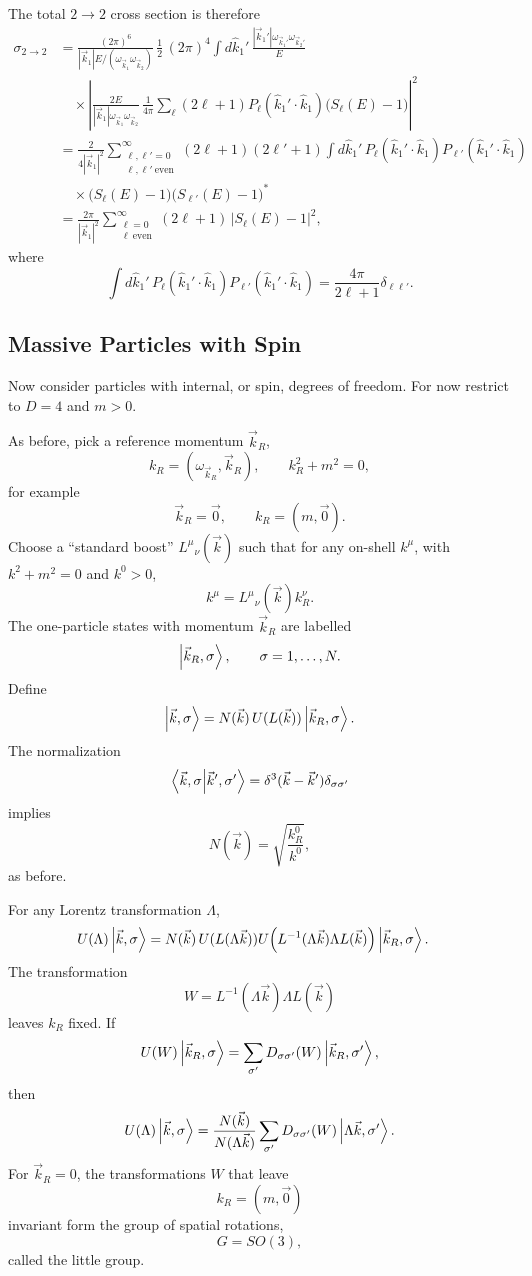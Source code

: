The total \(2\to2\) cross section is therefore
\[
\begin{aligned}
\sigma_{2\to2}
&=
\frac{(2\pi)^6}{|\vec k_1|E/(\omega_{\vec k_1}\omega_{\vec k_2})}\,
\frac12\,(2\pi)^4
\int d\hat k_1'\,
\frac{|\vec k_1'|\omega_{\vec k_1'}\omega_{\vec k_2'}}{E}
\\
&\quad \times
\left|
\frac{2E}{|\vec k_1|\omega_{\vec k_1}\omega_{\vec k_2}}\,
\frac{1}{4\pi}
\sum_\ell (2\ell+1)P_\ell(\hat k_1'\cdot \hat k_1)
\bigl(S_\ell(E)-1\bigr)
\right|^2
\\
&=
\frac{2}{4|\vec k_1|^2}
\sum_{\substack{\ell,\ell'=0\\ \ell,\ell'\ \mathrm{even}}}^{\infty}
(2\ell+1)(2\ell'+1)
\int d\hat k_1'\,
P_\ell(\hat k_1'\cdot\hat k_1)
P_{\ell'}(\hat k_1'\cdot\hat k_1)
\\
&\quad \times
\bigl(S_\ell(E)-1\bigr)\bigl(S_{\ell'}(E)-1\bigr)^*
\\
&=
\frac{2\pi}{|\vec k_1|^2}
\sum_{\substack{\ell=0\\ \ell\ \mathrm{even}}}^{\infty}
(2\ell+1)\,\bigl|S_\ell(E)-1\bigr|^2,
\end{aligned}
\]
where
\[
  \int d\hat k_1'\,
  P_\ell(\hat k_1'\cdot\hat k_1)P_{\ell'}(\hat k_1'\cdot\hat k_1)
  =
  \frac{4\pi}{2\ell+1}\delta_{\ell\ell'}.
\]

\subsection{Massive Particles with Spin}

Now consider particles with internal, or spin, degrees of freedom.  For now
restrict to \(D=4\) and \(m>0\).

As before, pick a reference momentum \(\vec k_R\),
\[
  k_R=(\omega_{\vec k_R},\vec k_R),\qquad k_R^2+m^2=0,
\]
for example
\[
  \vec k_R=\vec0,\qquad k_R=(m,\vec0).
\]
Choose a ``standard boost'' \(L^\mu{}_\nu(\vec k)\) such that for any
on-shell \(k^\mu\), with \(k^2+m^2=0\) and \(k^0>0\),
\[
  k^\mu=L^\mu{}_\nu(\vec k)k_R^\nu.
\]
The one-particle states with momentum \(\vec k_R\) are labelled
\[
  \ket{\vec k_R,\sigma},\qquad \sigma=1,\ldots,N.
\]
Define
\[
  \ket{\vec k,\sigma}
  =
  N(\vec k)\,U(L(\vec k))\ket{\vec k_R,\sigma}.
\]
The normalization
\[
  \braket{\vec k,\sigma}{\vec k',\sigma'}
  =
  \delta^3(\vec k-\vec k')\delta_{\sigma\sigma'}
\]
implies
\[
  N(\vec k)=\sqrt{\frac{k_R^0}{k^0}},
\]
as before.

For any Lorentz transformation \(\Lambda\),
\[
\begin{aligned}
U(\Lambda)\ket{\vec k,\sigma}
&=
N(\vec k)\,
U(L(\Lambda\vec k))
U\!\left(L^{-1}(\Lambda\vec k)\Lambda L(\vec k)\right)
\ket{\vec k_R,\sigma}.
\end{aligned}
\]
The transformation
\[
  W=L^{-1}(\Lambda\vec k)\Lambda L(\vec k)
\]
leaves \(k_R\) fixed.  If
\[
  U(W)\ket{\vec k_R,\sigma}
  =
  \sum_{\sigma'}D_{\sigma\sigma'}(W)\ket{\vec k_R,\sigma'},
\]
then
\[
  U(\Lambda)\ket{\vec k,\sigma}
  =
  \frac{N(\vec k)}{N(\Lambda\vec k)}
  \sum_{\sigma'}D_{\sigma\sigma'}(W)
  \ket{\Lambda\vec k,\sigma'}.
\]
For \(\vec k_R=0\), the transformations \(W\) that leave
\[
  k_R=(m,\vec0)
\]
invariant form the group of spatial rotations,
\[
  G=SO(3),
\]
called the little group.

